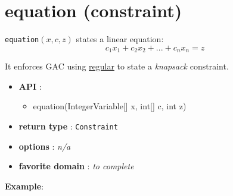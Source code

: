 \label{equation}
\hypertarget{equation}{}

\section{equation (constraint)}\label{equation:equationconstraint}\hypertarget{equation:equationconstraint}{}
\begin{notedef}
  \texttt{equation}$(x,c,z)$ states a linear equation:
$$c_1x_1+c_2x_2+...+c_nx_n = z$$
\end{notedef}
It enforces GAC using \hyperlink{regular:regularconstraint}{regular} to state a \emph{knapsack} constraint.

\begin{itemize}
	\item \textbf{API} :
	\begin{itemize}
		\item equation(IntegerVariable[] x, int[] c, int z)
	\end{itemize}
	\item \textbf{return type} : \texttt{Constraint}
	\item \textbf{options} : \emph{n/a}
	\item \textbf{favorite domain} : \emph{to complete}
\end{itemize}

\textbf{Example}:

